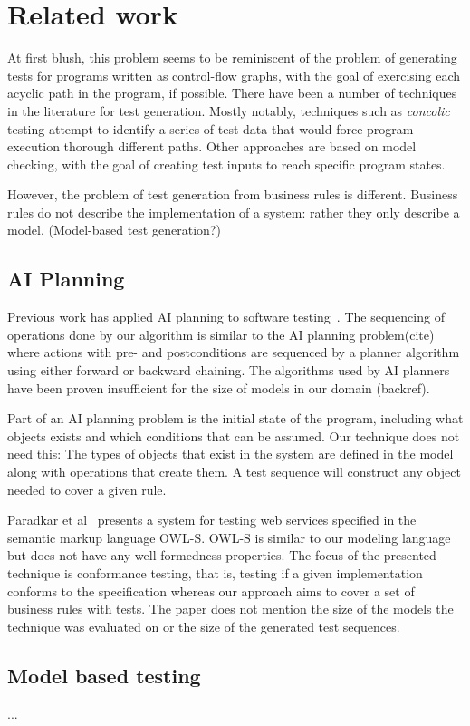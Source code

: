 \section{Related work}

At first blush, this problem seems to be reminiscent of the problem of generating tests for programs 
written as control-flow graphs, with the goal of exercising each acyclic path in the program, if
possible.  There have been a number of techniques in the literature for test generation. Mostly
notably, techniques such as \textit{concolic} testing attempt to identify a series of test data 
that would force program execution thorough different paths.  Other approaches are based on model
checking, with the goal of creating test inputs to reach specific program states.

However, the problem of test generation from business rules is different.  Business rules do not
describe the implementation of a system: rather they only describe a model.  (Model-based test 
generation?)

\subsection{AI Planning}

Previous work has applied AI planning to software testing~\cite{Scheetz99ai,Howe97testcase}. The sequencing of operations done by our algorithm is similar to the AI planning problem(cite) where actions with pre- and postconditions are sequenced by a planner algorithm using either forward or backward chaining. The algorithms used by AI planners have been proven insufficient for the size of models in our domain (backref). 

Part of an AI planning problem is the initial state of the program, including what objects exists and which conditions that can be assumed. Our technique does not need this: The types of objects that exist in the system are defined in the model along with operations that create them. A test sequence will construct any object needed to cover a given rule. 

Paradkar et al~\cite{conf/icws/ParadkarSWJOSL07} presents a system for testing web services specified in the semantic markup language OWL-S. OWL-S is similar to our modeling language but does not have any well-formedness properties. The focus of the presented technique is conformance testing, that is, testing if a given implementation conforms to the specification whereas our approach aims to cover a set of business rules with tests. The paper does not mention the size of the models the technique was evaluated on or the size of the generated test sequences.


\subsection{Model based testing}

...